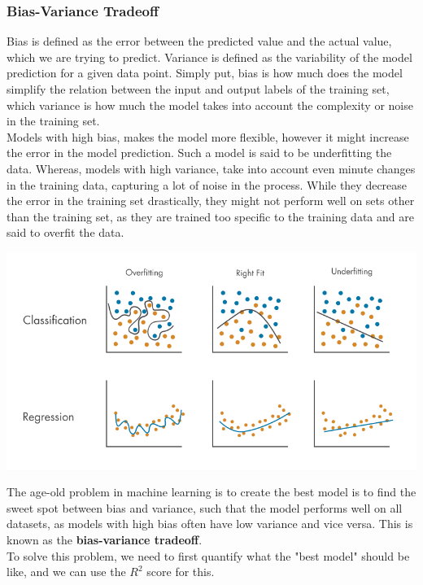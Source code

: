 \documentclass[12pt]{article}
\begin{document}
\subsubsection*{Bias-Variance Tradeoff} \label{bias-variance}
Bias is defined as the error between the predicted value and the actual value, which we are trying to predict. Variance is defined as the variability of the model prediction for a given data point. Simply put, bias is how much does the model simplify the relation between the input and output labels of the training set, which variance is how much the model takes into account the complexity or noise in the training set.\\
Models with high bias, makes the model more flexible, however it might increase the error in the model prediction. Such a model is said to be underfitting the data. Whereas, models with high variance, take into account even minute changes in the training data, capturing a lot of noise in the process. While they decrease the error in the training set drastically, they might not perform well on sets other than the training set, as they are trained too specific to the training data and are said to overfit the data.\\
\begin{center}
    \includegraphics*[width=15cm]{underfit-overfit.png}\\
\end{center}
The age-old problem in machine learning is to create the best model is to find the sweet spot between bias and variance, such that the model performs well on all datasets, as models with high bias often have low variance and vice versa. This is known as the \textbf{bias-variance tradeoff}.\\
To solve this problem, we need to first quantify what the "best model" should be like, and we can use the $R^2$ score for this. \\
\end{document}
